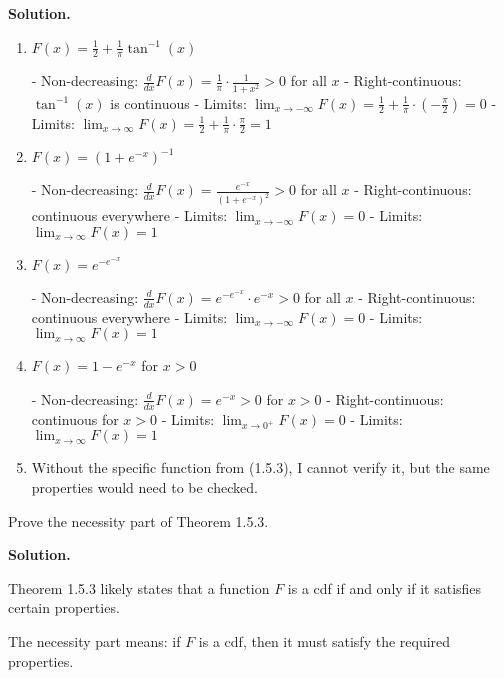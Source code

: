 \noindent\textbf{Solution.}
\begin{enumerate}[label=(\alph*)]
    \item $F(x) = \frac{1}{2} + \frac{1}{\pi}\tan^{-1}(x)$
    
    - Non-decreasing: $\frac{d}{dx}F(x) = \frac{1}{\pi} \cdot \frac{1}{1+x^2} > 0$ for all $x$
    - Right-continuous: $\tan^{-1}(x)$ is continuous
    - Limits: $\lim_{x \to -\infty} F(x) = \frac{1}{2} + \frac{1}{\pi} \cdot (-\frac{\pi}{2}) = 0$
    - Limits: $\lim_{x \to \infty} F(x) = \frac{1}{2} + \frac{1}{\pi} \cdot \frac{\pi}{2} = 1$
    
    \item $F(x) = (1 + e^{-x})^{-1}$
    
    - Non-decreasing: $\frac{d}{dx}F(x) = \frac{e^{-x}}{(1 + e^{-x})^2} > 0$ for all $x$
    - Right-continuous: continuous everywhere
    - Limits: $\lim_{x \to -\infty} F(x) = 0$
    - Limits: $\lim_{x \to \infty} F(x) = 1$
    
    \item $F(x) = e^{-e^{-x}}$
    
    - Non-decreasing: $\frac{d}{dx}F(x) = e^{-e^{-x}} \cdot e^{-x} > 0$ for all $x$
    - Right-continuous: continuous everywhere
    - Limits: $\lim_{x \to -\infty} F(x) = 0$
    - Limits: $\lim_{x \to \infty} F(x) = 1$
    
    \item $F(x) = 1 - e^{-x}$ for $x > 0$
    
    - Non-decreasing: $\frac{d}{dx}F(x) = e^{-x} > 0$ for $x > 0$
    - Right-continuous: continuous for $x > 0$
    - Limits: $\lim_{x \to 0^+} F(x) = 0$
    - Limits: $\lim_{x \to \infty} F(x) = 1$
    
    \item Without the specific function from (1.5.3), I cannot verify it, but the same properties would need to be checked.
\end{enumerate}


\begin{problembox}
Prove the necessity part of Theorem 1.5.3.
\end{problembox}

\noindent\textbf{Solution.}

Theorem 1.5.3 likely states that a function $F$ is a cdf if and only if it satisfies certain properties.

The necessity part means: if $F$ is a cdf, then it must satisfy the required properties.

